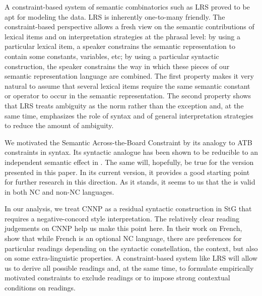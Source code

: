\documentclass[output=paper]{langsci/langscibook}
\begin{document}
A constraint-based system of semantic combinatorics such as LRS proved to be apt for modeling the data. LRS is inherently one-to-many friendly. The constraint-based perspective allows a fresh view on the semantic contributions of lexical items and on interpretation strategies at the phrasal level: by using a particular lexical item, a speaker constrains the semantic representation to contain some constants, variables, etc; by using a particular syntactic construction, the speaker constrains the way in which these pieces of our semantic representation language are combined. 
The first property makes it very natural to assume that several lexical items require the same semantic constant or operator to occur in the semantic representation. 
The second property shows that LRS treats ambiguity as the norm rather than the exception and, at the same time, emphasizes the role of syntax and of general interpretation strategies to reduce the amount of ambiguity.

We motivated the Semantic Across-the-Board Constraint by its analogy to ATB constraints in syntax. Its syntactic analogue has been shown to be reducible to an independent semantic effect in \citet{Chaves:12}. The same will, hopefully, be true for the version presented in this paper.
In its current version, it provides a good starting point for further research in this direction.
As it stands, it seems to us that the \SemATB{} is valid in both NC and non-NC languages.


In our analysis, we treat CNNP as a residual syntactic construction in StG that requires a negative-concord style interpretation. The relatively clear reading judgements on CNNP help us make this point here. 
In their work on French, \citet{Burnett:al:15} show that while French is an optional NC language, there are preferences for particular readings depending on the syntactic constellation, the context, but also on some extra-linguistic properties. A constraint-based system like  LRS will allow us to derive all possible readings and, at the same time, to formulate empirically motivated constraints to exclude readings or to impose strong contextual conditions on readings.


\end{document}
